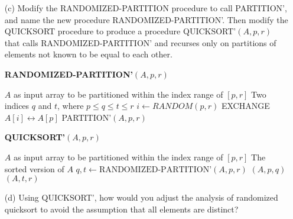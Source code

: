 \begin{itemize}
    \item[(c)] Modify the RANDOMIZED-PARTITION procedure to call PARTITION’, and name the new procedure RANDOMIZED-PARTITION’. Then modify the QUICKSORT procedure to produce a procedure QUICKSORT’$(A, p, r)$ that calls RANDOMIZED-PARTITION’ and recurses only on partitions of elements not known to be equal to each other. 
\begin{algorithm}[h]
\caption{\textbf{RANDOMIZED-PARTITION'}$(A, p, r)$} \label{alg:rand-partition'}
\begin{algorithmic}[1]
\Require $A$ as input array to be partitioned within the index range of $[p, r]$
\Ensure Two indices $q$ and $t$, where $p \leq q \leq t \leq r$
\State $i \leftarrow RANDOM(p, r)$
\State EXCHANGE $A[i] \leftrightarrow A[p]$ 
\State \Return PARTITION'$(A, p, r)$
\end{algorithmic}
\end{algorithm}

\begin{algorithm}[h]
\caption{\textbf{QUICKSORT’}$(A, p, r)$} \label{alg:quick-sort'}
\begin{algorithmic}[1]
\Require $A$ as input array to be partitioned within the index range of $[p, r]$
\Ensure The sorted version of $A$
    \State $q, t \leftarrow \text{RANDOMIZED-PARTITION'}(A, p, r)$
    \State {}$(A, p, q)$
    \State {}$(A, t, r)$
\EndIf
\end{algorithmic}
\end{algorithm}
    \item[(d)] Using QUICKSORT’, how would you adjust the analysis of randomized quicksort to avoid the assumption that all elements are distinct? \\
\end{itemize}
